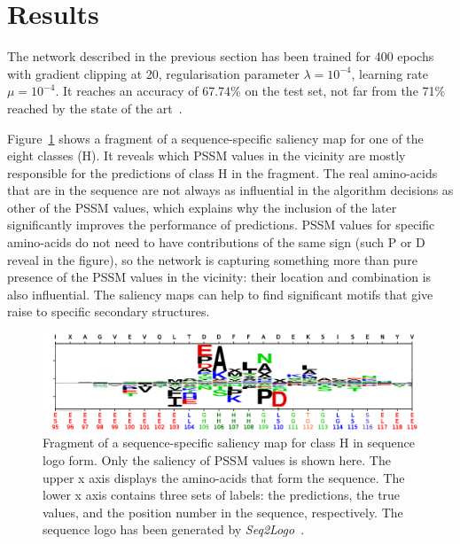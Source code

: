 \documentclass{article}
\begin{document}
\section{Results}
\label{sec:results}

The network described in the previous section has been trained for 400 epochs with gradient clipping at 20, regularisation parameter $\lambda=10^{-4}$, learning rate $\mu=10^{-4}$. It reaches an accuracy of 67.74\% on the test set, not far from the 71\% reached by the state of the art~\cite{Busia2017}.


Figure~\ref{fig:result} shows a fragment of a sequence-specific saliency map for one of the eight classes (H). It reveals which PSSM values in the vicinity are mostly responsible for the predictions of class H in the fragment. The real amino-acids that are in the sequence are not always as influential in the algorithm decisions as other of the PSSM values, which explains why the inclusion of the later significantly improves the performance of predictions. PSSM values for specific amino-acids do not need to have contributions of the same sign (such P or D reveal in the figure), so the network is capturing something more than pure presence of the PSSM values in the vicinity: their location and combination is also influential. The saliency maps can help to find significant motifs that give raise to specific secondary structures.

\begin{figure}
	\centering
	\centerline{\includegraphics[width=17.8cm]{sample_Hclass}}
	\caption{Fragment of a sequence-specific saliency map for class H in sequence logo form. Only the saliency of PSSM values is shown here. The upper x axis displays the amino-acids that form the sequence. The lower x axis contains three sets of labels: the predictions, the true values, and the position number in the sequence, respectively. The sequence logo has been generated by \textit{Seq2Logo}~\cite{Thomsen2012}.}
	\label{fig:result}
\end{figure}
\end{document}
